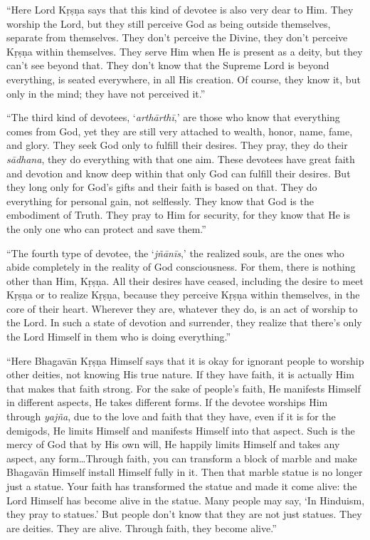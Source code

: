\enquote{Here Lord Kṛṣṇa says that this kind of devotee is also very dear to Him. They worship the Lord, but they still perceive God as being outside themselves, separate from themselves. They don’t perceive the Divine, they don’t perceive Kṛṣṇa within themselves. They serve Him when He is present as a deity, but they can’t see beyond that. They don’t know that the Supreme Lord is beyond everything, is seated everywhere, in all His creation. Of course, they know it, but only in the mind; they have not perceived it.}

\enquote{The third kind of devotees, \enquote{\textit{arthārthī},} are those who know that everything comes from God, yet they are still very attached to wealth, honor, name, fame, and glory. They seek God only to fulfill their desires. They pray, they do their \textit{sādhana}, they do everything with that one aim. These devotees have great faith and devotion and know deep within that only God can fulfill their desires. But they long only for God’s gifts and their faith is based on that. They do everything for personal gain, not selflessly. They know that God is the embodiment of Truth. They pray to Him for security, for they know that He is the only one who can protect and save them.}

\enquote{The fourth type of devotee, the \enquote{\textit{jñānīs},} the realized souls, are the ones who abide completely in the reality of God consciousness. For them, there is nothing other than Him, Kṛṣṇa. All their desires have ceased, including the desire to meet Kṛṣṇa or to realize Kṛṣṇa, because they perceive Kṛṣṇa within themselves, in the core of their heart. Wherever they are, whatever they do, is an act of worship to the Lord. In such a state of devotion and surrender, they realize that there’s only the Lord Himself in them who is doing everything.}

\enquote{Here Bhagavān Kṛṣṇa Himself says that it is okay for ignorant people to worship other deities, not knowing His true nature. If they have faith, it is actually Him that makes that faith strong. For the sake of people’s faith, He manifests Himself in different aspects, He takes different forms. If the devotee worships Him through \textit{yajña}, due to the love and faith that they have, even if it is for the demigods, He limits Himself and manifests Himself into that aspect. Such is the mercy of God that by His own will, He happily limits Himself and takes any aspect, any form\ldots Through faith, you can transform a block of marble and make Bhagavān Himself install Himself fully in it. Then that marble statue is no longer just a statue. Your faith has transformed the statue and made it come alive: the Lord Himself has become alive in the statue. Many people may say, \enquote{In Hinduism, they pray to statues.} But people don’t know that they are not just statues. They are deities. They are alive. Through faith, they become alive.}


